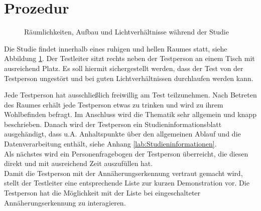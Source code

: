 \documentclass[12pt,bibliography=totocnumbered,listof=totocnumbered,abstracton]{scrreprt}
\begin{document}
\section{Prozedur}
\begin{figure}
\centering
{}
\caption{Räumlichkeiten, Aufbau und Lichtverhältnisse während der Studie}
\label{prozedurumgebung}
\end{figure}
Die Studie findet innerhalb eines ruhigen und hellen Raumes statt, siehe Abbildung \ref{prozedurumgebung}. Der Testleiter sitzt rechts neben der Testperson an einem Tisch mit ausreichend Platz. Es soll hiermit sichergestellt werden, dass der Test von der Testperson ungestört und bei guten Lichtverhältnissen durchlaufen werden kann.

Jede Testperson hat ausschließlich freiwillig am Test teilzunehmen. Nach Betreten des Raumes erhält jede Testperson etwas zu trinken und wird zu ihrem Wohlbefinden befragt. Im Anschluss wird die Thematik sehr allgemein und knapp beschrieben. Danach wird der Testperson ein Studieninformationsblatt ausgehändigt, dass u.A. Anhaltspunkte über den allgemeinen Ablauf und die Datenverarbeitung enthält, siehe Anhang \ref{lab:Studieninformationen}.\\
Als nächstes wird ein Personenfragebogen der Testperson überreicht, die diesen direkt und mit ausreichend Zeit auszufüllen hat.\\
Damit die Testperson mit der Annäherungserkennung vertraut gemacht wird, stellt der Testleiter eine entsprechende Liste zur kurzen Demonstration vor. Die Testperson hat die Möglichkeit mit der Liste bei eingeschalteter Annäherungserkennung zu interagieren.
\end{document}
